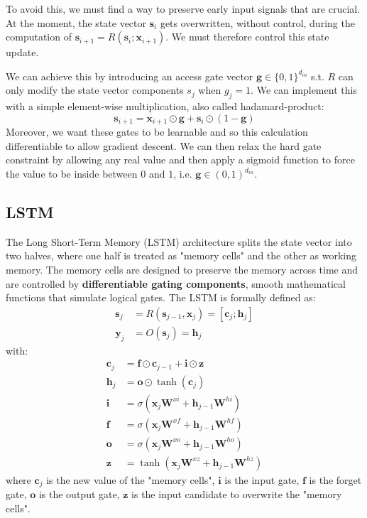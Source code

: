 To avoid this, we must find a way to preserve early input signals that are crucial. At the moment, the state vector $\mathbf{s}_{i}$ gets overwritten, without control, during the computation of $\mathbf{s}_{i+1}=R(\mathbf{s}_{i};\mathbf{x}_{i+1})$. We must therefore control this state update.

We can achieve this by introducing an access gate vector $\mathbf{g}\in\{0,1\}^{d_{in}}$ s.t. $R$ can only modify the state vector components $s_{j}$ when $g_{j}=1$. We can implement this with a simple element-wise multiplication, also called hadamard-product:
\[
\mathbf{s}_{i+1}=\mathbf{x}_{i+1}\odot\mathbf{g} + \mathbf{s}_{i}\odot (1-\mathbf{g})
\]
Moreover, we want these gates to be learnable and so this calculation differentiable to allow gradient descent. We can then relax the hard gate constraint by allowing any real value and then apply a sigmoid function to force the value to be inside between $0$ and $1$, i.e. $\mathbf{g}\in (0,1)^{d_{in}}$.

\subsection{LSTM}
The Long Short-Term Memory (LSTM) architecture splits the state vector into two halves, where one half is treated as "memory cells" and the other as working memory. The memory cells are designed to preserve the memory across time and are controlled by \textbf{differentiable gating components}, smooth mathematical functions that simulate logical gates. The LSTM is formally defined as:
\[
\begin{aligned}
\mathbf{s}_{j}&=R(\mathbf{s}_{j-1}, \mathbf{x}_{j})=[\mathbf{c}_{j};\mathbf{h}_{j}] \\
\mathbf{y}_{j}&=O(\mathbf{s}_{j})=\mathbf{h}_{j}
\end{aligned}
\]
with:
\[
\begin{aligned}
\mathbf{c}_{j}&=\mathbf{f} \odot \mathbf{c}_{j-1} + \mathbf{i} \odot \mathbf{z} \\
\mathbf{h}_{j}&=\mathbf{o} \odot \tanh(\mathbf{c}_{j}) \\
\mathbf{i}&=\sigma(\mathbf{x}_{j}\mathbf{W}^{xi} + \mathbf{h}_{j-1}\mathbf{W}^{hi}) \\
\mathbf{f}&=\sigma(\mathbf{x}_{j}\mathbf{W}^{xf} + \mathbf{h}_{j-1}\mathbf{W}^{hf}) \\
\mathbf{o}&=\sigma(\mathbf{x}_{j}\mathbf{W}^{xo} + \mathbf{h}_{j-1}\mathbf{W}^{ho}) \\
\mathbf{z}&=\tanh(\mathbf{x}_{j}\mathbf{W}^{xz} + \mathbf{h}_{j-1}\mathbf{W}^{hz})
\end{aligned}
\]
where $\mathbf{c}_{j}$ is the new value of the "memory cells", $\mathbf{i}$ is the input gate, $\mathbf{f}$ is the forget gate, $\mathbf{o}$ is the output gate, $\mathbf{z}$ is the input candidate to overwrite the "memory cells".

